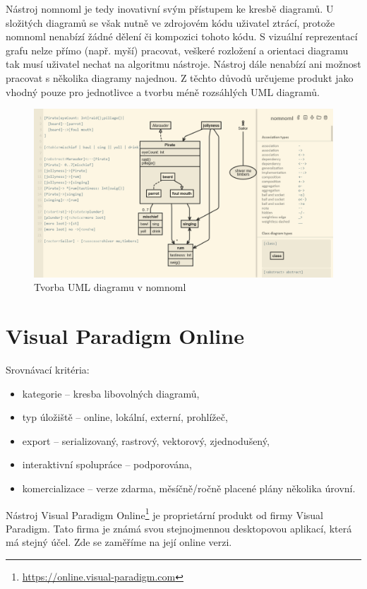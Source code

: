 Nástroj nomnoml je tedy inovativní svým přístupem ke kresbě diagramů.
U složitých diagramů se však nutně ve zdrojovém kódu uživatel ztrácí, protože nomnoml nenabízí žádné dělení či kompozici tohoto kódu.
S vizuální reprezentací grafu nelze přímo (např. myší) pracovat, veškeré rozložení a orientaci diagramu tak musí uživatel nechat na algoritmu nástroje.
Nástroj dále nenabízí ani možnost pracovat s několika diagramy najednou.
Z těchto důvodů určujeme produkt jako vhodný pouze pro jednotlivce a tvorbu méně rozsáhlých UML diagramů.

\begin{figure}[!htb]
  \centering
  \includegraphics[width = \maxwidth{\textwidth}]{../img/nomnoml.png}
  \caption{Tvorba UML diagramu v nomnoml}
  \label{fig:nomnoml}
\end{figure}

\section{Visual Paradigm Online}

Srovnávací kritéria:
\begin{itemize}
  \item kategorie -- kresba libovolných diagramů,
  \item typ úložiště -- online, lokální, externí, prohlížeč,
  \item export -- serializovaný, rastrový, vektorový, zjednodušený,
  \item interaktivní spolupráce -- podporována,
  \item komercializace -- verze zdarma, měsíčně/ročně placené plány několika úro\-vní.
\end{itemize}

Nástroj Visual Paradigm Online\footnote{\url{https://online.visual-paradigm.com}} je proprietární produkt od firmy Visual Paradigm.
Tato firma je známá svou stejnojmennou desktopovou aplikací, která má stejný účel. Zde se zaměříme na její online verzi.


